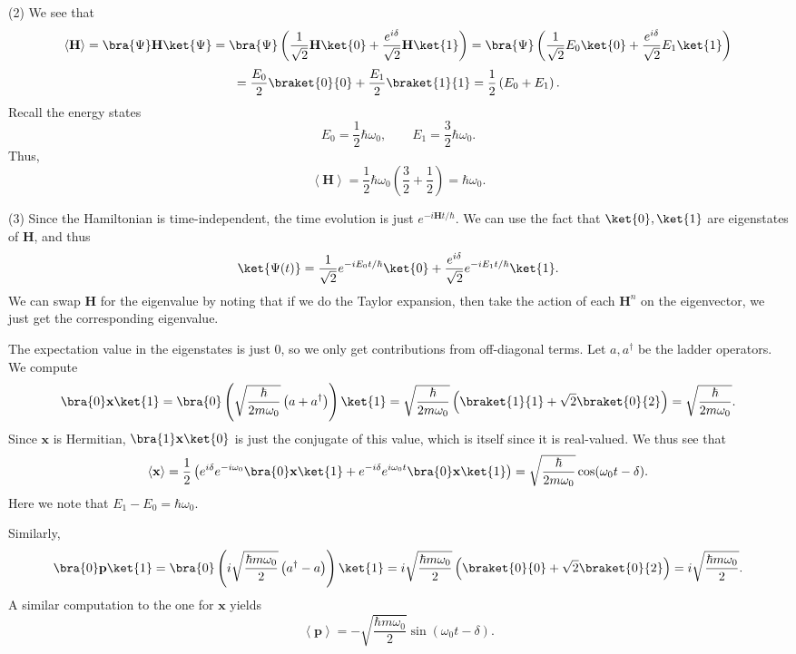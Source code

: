 \documentclass[11pt, letterpaper]{article}
\begin{document}
(2) We see that
\[
	\left\langle \mathbf{H}  \right\rangle =\bra{\Psi }\mathbf{H} \ket{\Psi }=\bra{\Psi }\left( \frac{1}{\sqrt{2} } \mathbf{H} \ket{0}+\frac{e^{i\delta } }{\sqrt{2} } \mathbf{H} \ket{1} \right) =\bra{\Psi }\left( \frac{1}{\sqrt{2} } E_0\ket{0}+\frac{e^{i\delta } }{\sqrt{2} } E_1\ket{1} \right) 
\]
\[
	=\frac{E_0}{2} \braket{0}{0}+\frac{E_1}{2} \braket{1}{1}=\frac{1}{2} \left( E_0+E_1 \right) 
.\]
Recall the energy states
\[
	E_0=\frac{1}{2} \hbar\omega _0,\qquad E_1=\frac{3}{2} \hbar \omega _0
.\]
Thus,
\[
	\left\langle \mathbf{H}  \right\rangle =\frac{1}{2} \hbar\omega _0\left( \frac{3}{2} +\frac{1}{2}  \right) =\hbar\omega _0
.\]

(3) Since the Hamiltonian is time-independent, the time evolution is just $e^{-i \mathbf{H} t/\hbar} $. We can use the fact that $\ket{0},\ket{1}$ are eigenstates of $\mathbf{H} $, and thus
\[
	\ket{\Psi(t) }=\frac{1}{\sqrt{2} } e^{-iE_0t/\hbar} \ket{0}+\frac{e^{i\delta } }{\sqrt{2} } e^{-iE_1t/\hbar} \ket{1}
.\]
We can swap $\mathbf{H} $ for the eigenvalue by noting that if we do the Taylor expansion, then take the action of each $\mathbf{H} ^n$ on the eigenvector, we just get the corresponding eigenvalue.

The expectation value in the eigenstates is just 0, so we only get contributions from off-diagonal terms. Let $a,a^\dagger$ be the ladder operators. We compute
\[
	\bra{0}\mathbf{x} \ket{1}=\bra{0}\left( \sqrt{\frac{\hbar}{2m\omega _0} } \left( a+a^\dagger \right)  \right) \ket{1}=\sqrt{\frac{\hbar}{2m\omega _0} } \left( \braket{1}{1}+\sqrt{2} \braket{0}{2} \right)=\sqrt{\frac{\hbar}{2m\omega _0} } 
.\]
Since $\mathbf{x} $ is Hermitian, $\bra{1}\mathbf{x}\ket{0}$ is just the conjugate of this value, which is itself since it is real-valued. We thus see that
\[
	\left\langle \mathbf{x}  \right\rangle =\frac{1}{2} \left( e^{i\delta } e^{-i\omega _0} \bra{0}\mathbf{x} \ket{1}+e^{-i\delta } e^{i\omega _0t} \bra{0}\mathbf{x} \ket{1} \right) =\sqrt{\frac{\hbar}{2m\omega _0} } \cos (\omega _0t-\delta )
.\]
Here we note that $E_1-E_0=\hbar\omega _0$.

Similarly,
\[
	\bra{0}\mathbf{p} \ket{1}=\bra{0}\left( i\sqrt{\frac{\hbar m\omega _0}{2} } \left( a^\dagger-a \right)  \right) \ket{1}=i\sqrt{\frac{\hbar m\omega _0}{2} } \left( \braket{0}{0}+\sqrt{2} \braket{0}{2} \right) =i\sqrt{\frac{\hbar m\omega _0}{2} } 
.\]
A similar computation to the one for $\mathbf{x} $ yields
\[
	\left\langle \mathbf{p}  \right\rangle =-\sqrt{\frac{\hbar m\omega _0}{2} } \sin (\omega _0t-\delta )
.\]
\end{document}
